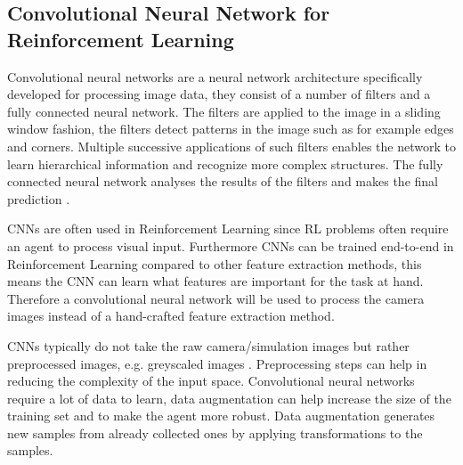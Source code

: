 

\subsection*{Convolutional Neural Network for Reinforcement Learning}

Convolutional neural networks are a neural network architecture specifically developed for processing image data, they consist of a number of filters and a fully connected neural network. The filters are applied to the image in a sliding window fashion, the filters detect patterns in the image such as for example edges and corners. Multiple successive applications of such filters enables the network to learn hierarchical information and recognize more complex structures. The fully connected neural network analyses the results of the filters and makes the final prediction \autocite{rlbook2020}.

CNNs are often used in Reinforcement Learning since RL problems often require an agent to process visual input. Furthermore CNNs can be trained end-to-end in Reinforcement Learning compared to other feature extraction methods, this means the CNN can learn what features are important for the task at hand.
Therefore a convolutional neural network will be used to process the camera images instead of a hand-crafted feature extraction method. 

CNNs typically do not take the raw camera/simulation images but rather preprocessed images, e.g. greyscaled images \autocite{atari}. Preprocessing steps can help in reducing the complexity of the input space. Convolutional neural networks require a lot of data to learn, data augmentation can help increase the size of the training set and to make the agent more robust. Data augmentation generates new samples from already collected ones by applying transformations to the samples. 


